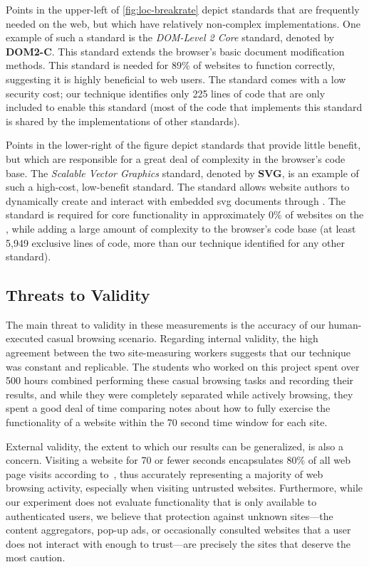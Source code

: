 Points in the upper-left of \ref{fig:loc-breakrate} depict standards that are
frequently needed on the web, but which have relatively non-complex
implementations.  One example of such a standard is the \textit{DOM-Level 2
Core} standard, denoted by \textbf{DOM2-C}.  This standard extends
the browser's basic document modification methods.  This standard is needed for
89\% of websites to function correctly, suggesting it is highly beneficial to
web users.  The standard comes with a low security cost; our technique
identifies only 225 lines of code that are only included to enable this
standard (most of the code that implements this standard is shared by the
implementations of other standards).

Points in the lower-right of the figure depict standards that provide
little benefit, but which are responsible for a great deal
of complexity in the browser's code base.  The \textit{Scalable Vector
Graphics} standard, denoted by \textbf{SVG}, is an example of
such a high-cost, low-benefit standard.  The standard allows website authors to
dynamically create and interact with embedded \gls{svg} documents through \JS.
The standard is required for core functionality in approximately 0\% of
websites on the \ATK, while adding a large amount of complexity to the
browser's code base (at least 5,949 exclusive lines of code, more than our
technique identified for any other standard).


\subsection{Threats to Validity}
The main threat to validity in these measurements is the accuracy of our
human-executed casual browsing scenario. Regarding internal validity, the high
agreement between the two site-measuring workers suggests that our technique
was constant and replicable.  The students who worked on this project spent
over 500 hours combined performing these casual browsing tasks and recording
their results, and while they were completely separated while actively
browsing, they spent a good deal of time comparing notes about how to fully
exercise the functionality of a website within the 70 second time window for
each site.

External validity, the extent to which our results can be generalized, is also
a concern. Visiting a website for 70 or fewer seconds encapsulates 80\% of all
web page visits according to~\cite{liu2010understanding}, thus accurately
representing a majority of web browsing activity, especially when visiting
untrusted websites. Furthermore, while our experiment does not evaluate
functionality that is only available to authenticated users, we believe that
protection against unknown sites---the content aggregators, pop-up ads, or
occasionally consulted websites that a user does not interact with enough to
trust---are precisely the sites that deserve the most caution.

